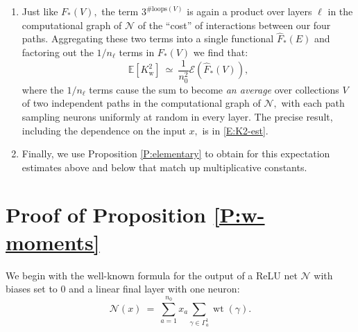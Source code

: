 \documentclass[11pt, reqno]{amsart}
\newcommand{\e}{\mathbb E}
\newcommand{\mN}{\mathcal N}
\newcommand{\Kw}{K_{\mathrm{w}}}
\newcommand{\Dww}{\Delta_{\mathrm{ww}}}
\newcommand{\mE}[1]{\mathcal E\left(#1\right)}
\DeclareMathOperator{\wt}{wt}
\begin{document}
\begin{enumerate}
    \item Just like $F_*(V),$ the term $3^{\#\mathrm{loops}(V)}$ is again a product over layers $\ell$ in the computational graph of $\mN$ of the ``cost'' of interactions between our four paths. Aggregating these two terms into a single functional $\widehat{F}_*(E)$ and factoring out the $1/n_{\ell}$ terms in $F_*(V)$ we find that:
    \[\e[\Kw^2]~\simeq ~ \frac{1}{n_0^2}\mE{\widehat{F}_*(V)},\]
    where the $1/n_\ell$ terms cause the sum to become \textit{an average} over collections $V$ of two independent paths in the computational graph of $\mN,$ with each path sampling neurons uniformly at random in every layer. The precise result, including the dependence on the input $x,$ is in \eqref{E:K2-est}.
    \item Finally, we use Proposition \ref{P:elementary} to obtain for this expectation estimates above and below that match up multiplicative constants. 
\end{enumerate}






\section{Proof of Proposition \ref{P:w-moments}}\label{S:w-moments-pf}
We begin with the well-known formula for the output of a ReLU net $\mN$ with biases set to $0$ and a linear final layer with one neuron:
\begin{equation}\label{E:sum-over-paths}
\mN(x)~=~\sum_{a=1}^{n_0}x_a \sum_{\gamma\in \Gamma_{a}^1}\wt(\gamma).
\end{equation}
\end{document}
